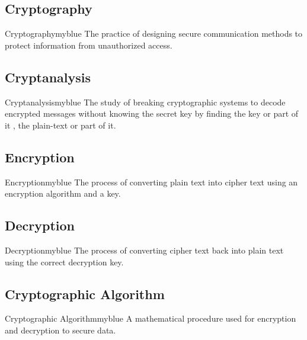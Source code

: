 \vspace{0.25cm}

\subsection{Cryptography}
\begin{prettyBox}{Cryptography}{myblue}
The practice of designing secure communication methods to protect information from unauthorized access.
\end{prettyBox}

\vspace{0.25cm}
\subsection{Cryptanalysis}
\begin{prettyBox}{Cryptanalysis}{myblue}
The study of breaking cryptographic systems to decode encrypted messages without knowing the secret key by finding
the key or part of it , the plain-text or part of it.
\end{prettyBox}

\vspace{0.25cm}
\subsection{Encryption}
\begin{prettyBox}{Encryption}{myblue}
The process of converting plain text into cipher text using an encryption algorithm and a key.
\end{prettyBox}

\vspace{0.25cm}
\subsection{Decryption}
\begin{prettyBox}{Decryption}{myblue}
The process of converting cipher text back into plain text using the correct decryption key.
\end{prettyBox}

\vspace{0.25cm}
\subsection{Cryptographic Algorithm}
\begin{prettyBox}{Cryptographic Algorithm}{myblue}
A mathematical procedure used for encryption and decryption to secure data.
\end{prettyBox}


